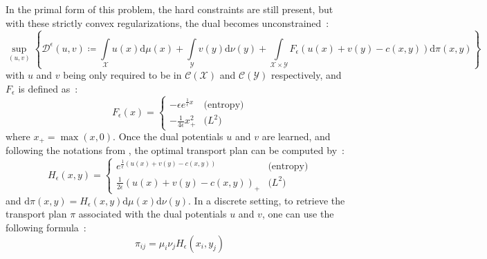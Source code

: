 \documentclass[a4paper,11pt]{article}
\newcommand{\1}{\mathbbm{1}}
\begin{document}
In the primal form of this problem, the hard constraints are still present, but with these strictly convex regularizations, the dual becomes unconstrained~:
\begin{equation}
    \label{eq:regularized_kantorovich_dual}
    \sup_{(u, v)}\left\{\mathcal{D}^{\epsilon}(u,v) \coloneq \int\limits_{\mathcal{X}} u(x) \mathrm{d}\mu(x) + \int\limits_{\mathcal{Y}} v(y) \mathrm{d}\nu(y) + \int\limits_{\mathcal{X} \times \mathcal{Y}} F_{\epsilon}(u(x) + v(y) - c(x, y)) \mathrm{d}\pi(x, y)\right\}
\end{equation}
with $u$ and $v$ being only required to be in $\mathcal{C}(\mathcal{X})$ and $\mathcal{C}(\mathcal{Y})$ respectively, and $F_{\epsilon}$ is defined as~:
\begin{equation}
    F_{\epsilon}(x) = \begin{cases}
        - \epsilon e^{\frac{1}{\epsilon}x} & \text{(entropy)} \\
        - \frac{1}{4\epsilon} x_+^2 & \text{($L^2$)}
    \end{cases}
\end{equation}
where $x_+ = \max(x, 0)$. Once the dual potentials $u$ and $v$ are learned, and following the notations from \citet{seguy2018largescaleoptimaltransportmapping}, the optimal transport plan can be computed by~:
\begin{equation}
    H_{\epsilon}(x, y) = \begin{cases}
        e^{\frac{1}{\epsilon}(u(x) + v(y) - c(x, y))} & \text{(entropy)} \\
        \frac{1}{2\epsilon}(u(x) + v(y) - c(x, y))_+ & \text{($L^2$)}
    \end{cases}
\end{equation}
and $\mathrm{d}\pi(x, y) = H_{\epsilon}(x, y) \mathrm{d}\mu(x) \mathrm{d}\nu(y)$. In a discrete setting, to retrieve the transport plan $\pi$ associated with the dual potentials $u$ and $v$, one can use the following formula~:
\begin{equation}
    \pi_{ij} = \mu_i \nu_j H_{\epsilon}(x_i, y_j)
\end{equation}
\end{document}
